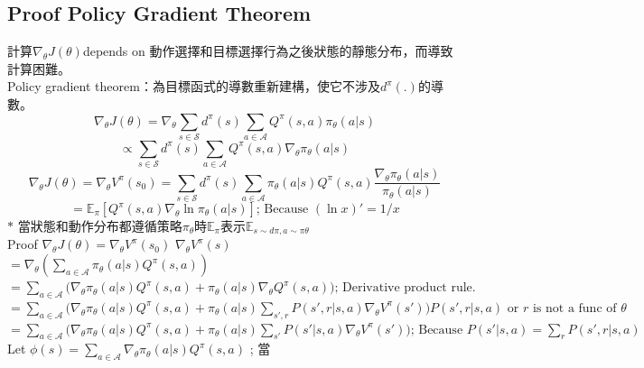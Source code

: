 \documentclass[14pt,a4paper]{report}  %
\begin{document}
\subsection{Proof Policy Gradient Theorem}
計算$\nabla_\theta J(\theta)$depends on 動作選擇和目標選擇行為之後狀態的靜態分布，而導致計算困難。\\[5pt]
Policy gradient theorem：為目標函式的導數重新建構，使它不涉及$d^\pi(.)$的導數。\\[5pt]
$$\nabla_\theta J(\theta) 
= \nabla_\theta \sum_{s \in \mathcal{S}} d^\pi(s) \sum_{a \in \mathcal{A}} Q^\pi(s, a) \pi_\theta(a \vert s) $$
$$\propto \sum_{s \in \mathcal{S}} d^\pi(s) \sum_{a \in \mathcal{A}} Q^\pi(s, a) \nabla_\theta \pi_\theta(a \vert s)$$
$$\nabla_\theta J(\theta)
= \nabla_\theta V^\pi(s_0)= \sum_{s \in \mathcal{S}} d^\pi(s) \sum_{a \in \mathcal{A}} \pi_\theta(a \vert s) Q^\pi(s, a) \frac{\nabla_\theta \pi_\theta(a \vert s)}{\pi_\theta(a \vert s)}$$
$$=\mathbb{E}_\pi [Q^\pi(s, a) \nabla_\theta \ln \pi_\theta(a \vert s)]  {\text{; Because } (\ln x)' = 1/x}$$
$\ast$ 當狀態和動作分布都遵循策略$\pi_{\theta}$時$\mathbb{E}_{\pi}$表示$\mathbb{E}_{s\sim d\pi,a\sim\pi\theta}$\\[5pt]
Proof $\nabla_\theta J(\theta)= \nabla_\theta V^\pi(s_0)$ 
$ \nabla_\theta V^\pi(s) $\\[5pt]
$= \nabla_\theta (\sum_{a \in \mathcal{A}} \pi_\theta(a \vert s)Q^\pi(s, a))$\\
$= \sum_{a \in \mathcal{A}} \Big( \nabla_\theta \pi_\theta(a \vert s)Q^\pi(s, a) + \pi_\theta(a \vert s) {\nabla_\theta Q^\pi(s, a)} \Big)  \scriptstyle{\text{; Derivative product rule.}} $\\
$= \sum_{a \in \mathcal{A}} \Big( \nabla_\theta \pi_\theta(a \vert s)Q^\pi(s, a) + \pi_\theta(a \vert s) {\sum_{s', r} P(s',r \vert s,a) \nabla_\theta V^\pi(s')} \Big)  \scriptstyle{P(s',r \vert s,a) \text{ or } r \text{ is not a func of }\theta}$\\[6pt]
$= \sum_{a \in \mathcal{A}} \Big( \nabla_\theta \pi_\theta(a \vert s)Q^\pi(s, a) + \pi_\theta(a \vert s){\sum_{s'} P(s' \vert s,a) \nabla_\theta V^\pi(s')} \Big)  \scriptstyle{\text{; Because }  P(s' \vert s, a) = \sum_r P(s', r \vert s, a)}$
Let $\phi(s) = \sum_{a \in \mathcal{A}} \nabla_\theta \pi_\theta(a \vert s)Q^\pi(s, a)$ ; 當
\end{document}
